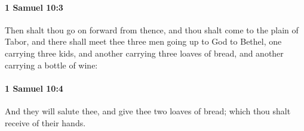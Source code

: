 		\paragraph{1 Samuel 10:3} %
			\label{1SAMUEL-10-3}

			Then shalt thou go on forward from thence, and thou shalt come to the plain of Tabor, and there shall meet thee three men going up to God to Bethel, one carrying three kids, and another carrying three loaves of bread, and another carrying a bottle of wine:


		\paragraph{1 Samuel 10:4} %
			\label{1SAMUEL-10-4}

			And they will salute thee, and give thee two loaves of bread; which thou shalt receive of their hands.


